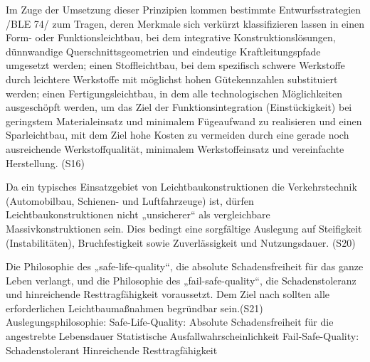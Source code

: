 Im Zuge der Umsetzung dieser Prinzipien kommen bestimmte Entwurfsstrategien /BLE 74/ zum Tragen, deren Merkmale sich verkürzt klassifizieren lassen in
  einen Form- oder Funktionsleichtbau, bei dem integrative Konstruktionslösungen, dünnwandige Querschnittsgeometrien und eindeutige Kraftleitungspfade umgesetzt werden;
  einen Stoffleichtbau, bei dem spezifisch schwere Werkstoffe durch leichtere Werkstoffe mit möglichst hohen Gütekennzahlen substituiert werden;
  einen Fertigungsleichtbau, in dem alle technologischen Möglichkeiten ausgeschöpft werden, um das Ziel der Funktionsintegration (Einstückigkeit) bei geringstem Materialeinsatz und minimalem Fügeaufwand zu realisieren
und
  einen Sparleichtbau, mit dem Ziel hohe Kosten zu vermeiden durch eine gerade noch ausreichende Werkstoffqualität, minimalem Werkstoffeinsatz und vereinfachte Herstellung.
(S16)

Da ein typisches Einsatzgebiet von Leichtbaukonstruktionen die Verkehrstechnik (Automobilbau, Schienen- und Luftfahrzeuge) ist, dürfen Leichtbaukonstruktionen nicht „unsicherer“ als vergleichbare Massivkonstruktionen sein. Dies bedingt eine sorgfältige Auslegung auf Steifigkeit (Instabilitäten), Bruchfestigkeit sowie Zuverlässigkeit und Nutzungsdauer. (S20)

Die Philosophie des „safe-life-quality“, die absolute Schadensfreiheit für das ganze Leben verlangt, und die Philosophie des „fail-safe-quality“, die Schadenstoleranz und hinreichende Resttragfähigkeit voraussetzt. Dem Ziel nach sollten alle erforderlichen Leichtbaumaßnahmen begründbar sein.(S21)
Auslegungsphilosophie:
  Safe-Life-Quality:
    Absolute Schadensfreiheit für die angestrebte Lebensdauer
    Statistische Ausfallwahrscheinlichkeit
  Fail-Safe-Quality:
    Schadenstolerant
    Hinreichende Resttragfähigkeit

